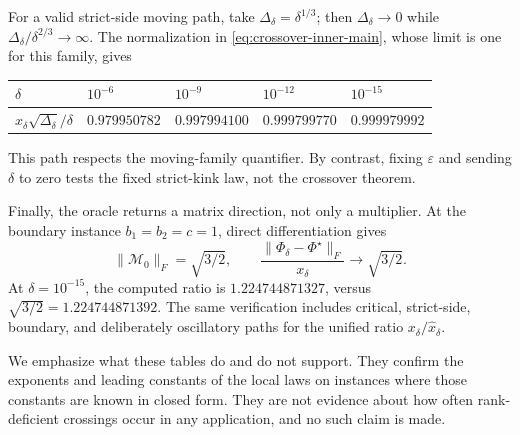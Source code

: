 For a valid strict-side moving path, take
\(\Delta_\delta=\delta^{1/3}\); then
\(\Delta_\delta\to0\) while
\(\Delta_\delta/\delta^{2/3}\to\infty\).  The normalization in
\eqref{eq:crossover-inner-main}, whose limit is one for this family, gives
\begin{center}
\begin{tabular}{@{}lllll@{}}
\toprule
\(\delta\) & \(10^{-6}\) & \(10^{-9}\) & \(10^{-12}\) & \(10^{-15}\)\\
\midrule
\(x_\delta\sqrt{\Delta_\delta}/\delta\) &
\(0.979950782\)&\(0.997994100\)&\(0.999799770\)&\(0.999979992\)\\
\bottomrule
\end{tabular}
\end{center}
This path respects the moving-family quantifier.  By contrast, fixing
\(\varepsilon\) and sending \(\delta\) to zero tests the fixed strict-kink
law, not the crossover theorem.

Finally, the oracle returns a matrix direction, not only a multiplier.  At
the boundary instance \(b_1=b_2=c=1\), direct differentiation gives
\[
 \|\mathcal M_0\|_F=\sqrt{3/2},
 \qquad
 \frac{\|\Phi_\delta-\Phi^\star\|_F}{x_\delta}
 \longrightarrow\sqrt{3/2}.
\]
At \(\delta=10^{-15}\), the computed ratio is
\(1.224744871327\), versus
\(\sqrt{3/2}=1.224744871392\).  The same verification includes critical,
strict-side, boundary, and deliberately oscillatory paths for the unified
ratio \(x_\delta/\widehat x_\delta\).

We emphasize what these tables do and do not support.  They confirm the
exponents and leading constants of the local laws on instances where those
constants are known in closed form.  They are not evidence about how often
rank-deficient crossings occur in any application, and no such claim is made.

